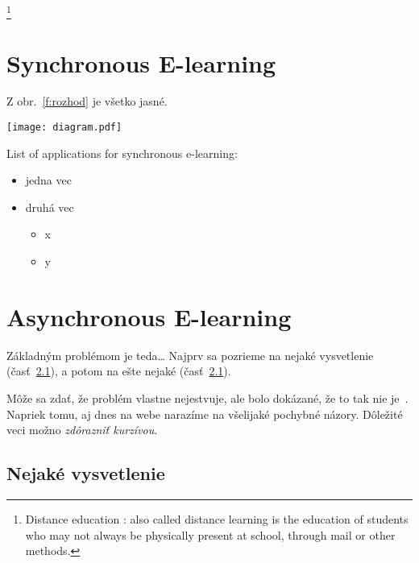 \documentclass[10pt,twoside,english,a4paper]{article}
\begin{document}
\footnote{Distance education : also called distance learning is the education of students who may not always be physically present at school, through mail or other methods.}





\section{Synchronous E-learning} \label{sync}

Z obr.~\ref{f:rozhod} je všetko jasné. 

\begin{figure*}[tbh]
\begin{center}
    \texttt{[image: diagram.pdf]}
\caption{Rozhodujúci argument.}
\label{f:rozhod}
\end{center}


List of applications for synchronous e-learning:
\begin{itemize}
\item jedna vec
\item druhá vec
	\begin{itemize}
	\item x
	\item y
	\end{itemize}
\end{itemize}

\end{figure*}



\section{Asynchronous E-learning} \label{async}

Základným problémom je teda\ldots{} Najprv sa pozrieme na nejaké vysvetlenie (časť~\ref{ina:nejake}), a potom na ešte nejaké (časť~\ref{ina:nejake}).

Môže sa zdať, že problém vlastne nejestvuje\cite{Coplien:MPD}, ale bolo dokázané, že to tak nie je~\cite{Czarnecki:Staged, Czarnecki:Progress}. Napriek tomu, aj dnes na webe narazíme na všelijaké pochybné názory\cite{PLP-Framework}. Dôležité veci možno \emph{zdôrazniť kurzívou}.


\subsection{Nejaké vysvetlenie} \label{ina:nejake}
\end{document}
